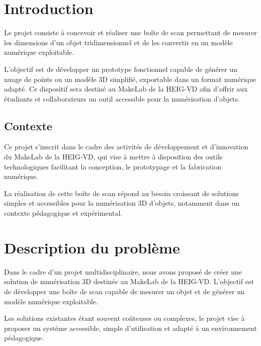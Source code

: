 \documentclass[11pt,a4paper]{report}
\begin{document}
\tableofcontents

\newpage


\chapter{Introduction}

Le projet consiste à concevoir et réaliser une boîte de scan permettant de mesurer les dimensions d’un objet tridimensionnel et de les convertir en un modèle numérique exploitable.

L’objectif est de développer un prototype fonctionnel capable de générer un nuage de points ou un modèle 3D simplifié, exportable dans un format numérique adapté. Ce dispositif sera destiné au MakeLab de la HEIG-VD afin d’offrir aux étudiants et collaborateurs un outil accessible pour la numérisation d’objets.

\section{Contexte}

Ce projet s’inscrit dans le cadre des activités de développement et d’innovation du MakeLab de la HEIG-VD, qui vise à mettre à disposition des outils technologiques facilitant la conception, le prototypage et la fabrication numérique.

La réalisation de cette boîte de scan répond au besoin croissant de solutions simples et accessibles pour la numérisation 3D d’objets, notamment dans un contexte pédagogique et expérimental.


\chapter{Description du problème}

Dans le cadre d’un projet multidisciplinaire, nous avons proposé de créer une solution de numérisation 3D destinée au MakeLab de la HEIG-VD. L’objectif est de développer une boîte de scan capable de mesurer un objet et de générer un modèle numérique exploitable.

Les solutions existantes étant souvent coûteuses ou complexes, le projet vise à proposer un système accessible, simple d’utilisation et adapté à un environnement pédagogique.
\end{document}
